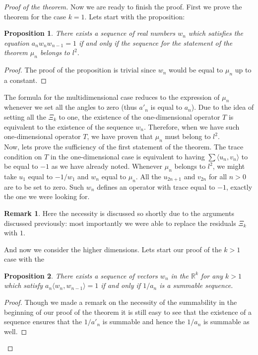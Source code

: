 \documentclass[12pt]{article}
\newtheorem{prop}{Proposition}
\theoremstyle{definition}
\newtheorem{remark}{Remark}
\numberwithin{remark}{section}
\numberwithin{theorem}{section}
\numberwithin{prop}{section}
\numberwithin{equation}{section}
\numberwithin{lemma}{section}
\numberwithin{prop_under_lemma}{lemma}
\begin{document}
\begin{proof}[Proof of the theorem]
        Now we are ready to finish the proof.
        First we prove the theorem for the case $k=1$. Lets start with the proposition:
        \begin{prop}
            There exists a sequence of real numbers $w_n$ which satisfies the equation $a_n w_n w_{n-1} = 1$ if and
            only if the sequence for the statement of the theorem $\mu_n$ belongs to $l^2$.
        \end{prop}
        \begin{proof}
            The proof of the proposition is trivial since $w_n$ would be equal to $\mu_n$ up to a constant.
        \end{proof}
        The formula for the multidimensional case reduces to the expression of $\mu_n$ whenever we
        set all the angles to zero (thus $a'_n$ is equal to $a_n$). Due to the idea of setting all the $\Xi_k$ to one,
        the existence of the one-dimensional operator $T$ is equivalent to the existence of the sequence $w_n$.
        Therefore, when we have such one-dimensional operator $T$, we have proven that $\mu_n$ must belong to $l^2$.\\
        
        Now, lets prove the sufficiency of the first statement of the theorem.
        The trace condition on $T$ in the one-dimensional case is 
        equivalent to having $\sum \langle u_n, v_n\rangle $ to be equal to $-1$ as we have already noted.
        Whenever $\mu_n$ belongs to $l^2$, we might take $u_1$ equal to $-1/w_1$ and $w_n$ equal to $\mu_n$.
        All the $u_{2n+1}$ and $v_{2n}$ for all $n>0$ are to be set to zero.
        Such $w_n$ defines an operator with trace equal to $-1$, exactly the one we were looking for.
        \begin{remark}
            Here the necessity is discussed so shortly due to the arguments discussed previously: most importantly we
            were able to replace the residuals $\Xi_k$ with $1$.
        \end{remark}
        \noindent And now we consider the higher dimensions. Lets start our proof of the $k > 1$ case with the 
        \begin{prop}
            There exists a sequence of vectors $w_n$ in the $\mathbb{R}^k$ for any $k > 1$ which satisfy $a_n \langle w_n, w_{n-1} \rangle = 1$ if and only if $1/a_n$ is a summable sequence.
        \end{prop}
        \begin{proof}
            Though we made a remark on the necessity of the summability
            in the beginning of our proof of the theorem it is still
            easy to see that the existence of a sequence ensures that the $1/a'_n$ is summable and hence
            the $1/a_n$ is summable as well.
            

\end{proof}
\end{proof}
\end{document}
